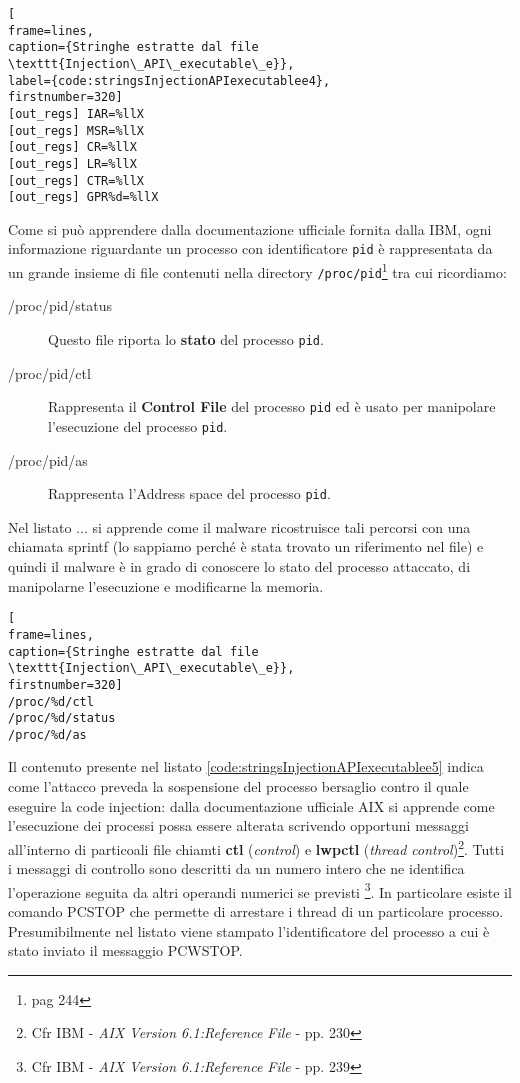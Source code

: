 \documentclass[10pt,a4paper, titlepage]{report}
\begin{document}
\begin{lstlisting}[
frame=lines, 
caption={Stringhe estratte dal file \texttt{Injection\_API\_executable\_e}}, 
label={code:stringsInjectionAPIexecutablee4},
firstnumber=320]
[out_regs] IAR=%llX
[out_regs] MSR=%llX
[out_regs] CR=%llX
[out_regs] LR=%llX
[out_regs] CTR=%llX
[out_regs] GPR%d=%llX
\end{lstlisting}

Come si può apprendere dalla documentazione ufficiale fornita dalla IBM, ogni informazione riguardante un processo con identificatore \texttt{pid} è rappresentata da un grande insieme di file contenuti nella directory \texttt{/proc/pid}\footnote{pag 244} tra cui ricordiamo:

\begin{description}
\item[/proc/pid/status] Questo file riporta lo \textbf{stato} del processo \texttt{pid}.
\item[/proc/pid/ctl] Rappresenta il \textbf{Control File} del processo \texttt{pid} ed è usato per manipolare l'esecuzione del processo \texttt{pid}.
\item[/proc/pid/as] Rappresenta l'Address space del processo \texttt{pid}.
\end{description}

Nel listato ... si apprende come il malware ricostruisce tali percorsi con una chiamata sprintf (lo sappiamo perché è stata trovato un riferimento nel file) e quindi il malware è in grado di conoscere lo stato del processo attaccato, di manipolarne l'esecuzione e modificarne la memoria.

\begin{lstlisting}[
frame=lines, 
caption={Stringhe estratte dal file \texttt{Injection\_API\_executable\_e}},
firstnumber=320]
/proc/%d/ctl
/proc/%d/status
/proc/%d/as
\end{lstlisting}

Il contenuto presente nel listato \ref{code:stringsInjectionAPIexecutablee5} indica come l'attacco preveda la sospensione del processo bersaglio contro il quale eseguire la code injection: dalla documentazione ufficiale AIX si apprende come l'esecuzione dei processi possa essere alterata scrivendo opportuni messaggi
 all'interno di particoali file chiamti \textbf{ctl} (\textit{control}) e \textbf{lwpctl} (\textit{thread control})\footnote{Cfr IBM - \textit{AIX Version 6.1:Reference File} - pp. 230}. Tutti i messaggi di controllo sono descritti da un numero intero che ne identifica l'operazione seguita da altri operandi numerici se previsti 
 \footnote{Cfr IBM - \textit{AIX Version 6.1:Reference File} - pp. 239}. In particolare esiste il comando PCSTOP che permette di arrestare i thread di un particolare processo. Presumibilmente nel listato viene stampato l'identificatore del processo a cui è stato inviato il messaggio PCWSTOP.
 
\end{document}
